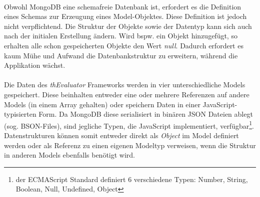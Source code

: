 \\
Obwohl MongoDB eine schemafreie Datenbank ist, erfordert es die Definition eines Schemas zur Erzeugung eines Model-Objektes. Diese Definition ist jedoch nicht verpflichtend. Die Struktur der Objekte sowie der Datentyp kann sich auch nach der initialen Erstellung ändern. Wird bspw. ein Objekt hinzugefügt, so erhalten alle schon gespeicherten Objekte den Wert \textit{null}. Dadurch erfordert es kaum Mühe und Aufwand die Datenbankstruktur zu erweitern, während die Applikation wächst.\\
\\
Die Daten des \textit{thEvaluator} Frameworks werden in vier unterschiedliche Models gespeichert. Diese beinhalten entweder eine oder mehrere Referenzen auf andere Models (in einem Array gehalten) oder speichern Daten in einer JavaScript-typisierten Form. Da MongoDB diese serialisiert in binären JSON Dateien ablegt (sog. BSON-Files), sind jegliche Typen, die JavaScript implementiert, verfügbar\footnote{der ECMAScript Standard definiert 6 verschiedene Typen: Number, String, Boolean, Null, Undefined, Object}. Datenstrukturen können somit entweder direkt als \textit{Object} im Model definiert werden oder als Referenz zu einen eigenen Modeltyp verweisen, wenn die Struktur in anderen Models ebenfalls benötigt wird.

